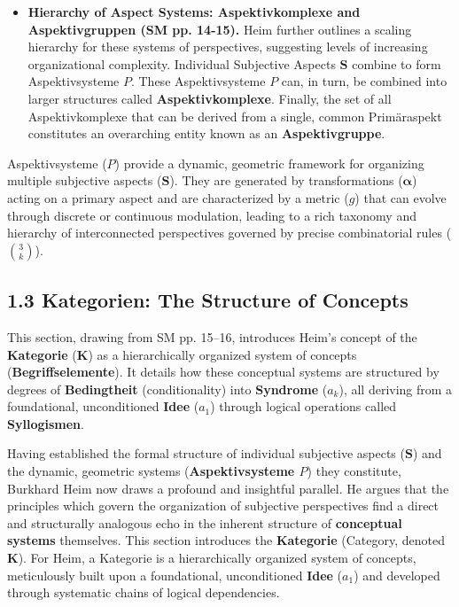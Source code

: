 \documentclass[12pt]{article}
\newcommand{\kategorie}{\bm{K}}
\newcommand{\conceptualsyndrome}{a} %
\newcommand{\aspektivsystem}{P}
\begin{document}
\begin{itemize}
    \item \textbf{Hierarchy of Aspect Systems: Aspektivkomplexe and Aspektivgruppen (SM pp. 14-15).}
    Heim further outlines a scaling hierarchy for these systems of perspectives, suggesting levels of increasing organizational complexity. Individual Subjective Aspects \( \mathbf{S} \) combine to form Aspektivsysteme \( \aspektivsystem \). These Aspektivsysteme \( \aspektivsystem \) can, in turn, be combined into larger structures called \textbf{Aspektivkomplexe}. Finally, the set of all Aspektivkomplexe that can be derived from a single, common Primäraspekt constitutes an overarching entity known as an \textbf{Aspektivgruppe}.
\end{itemize}

Aspektivsysteme (\(\aspektivsystem\)) provide a dynamic, geometric framework for organizing multiple subjective aspects (\(\mathbf{S}\)). They are generated by transformations (\(\bm{\alpha}\)) acting on a primary aspect and are characterized by a metric (\(g\)) that can evolve through discrete or continuous modulation, leading to a rich taxonomy and hierarchy of interconnected perspectives governed by precise combinatorial rules (\(\binom{3}{k}\)).

\subsection{1.3 Kategorien: The Structure of Concepts}
\label{sec:kategorien}

This section, drawing from SM pp. 15--16, introduces Heim's concept of the \textbf{Kategorie} (\(\kategorie\)) as a hierarchically organized system of concepts (\textbf{Begriffselemente}). It details how these conceptual systems are structured by degrees of \textbf{Bedingtheit} (conditionality) into \textbf{Syndrome} (\(\conceptualsyndrome_k\)), all deriving from a foundational, unconditioned \textbf{Idee} (\(\conceptualsyndrome_1\)) through logical operations called \textbf{Syllogismen}.

Having established the formal structure of individual subjective aspects (\(\mathbf{S}\)) and the dynamic, geometric systems (\textbf{Aspektivsysteme \(\aspektivsystem\)}) they constitute, Burkhard Heim now draws a profound and insightful parallel. He argues that the principles which govern the organization of subjective perspectives find a direct and structurally analogous echo in the inherent structure of \textbf{conceptual systems} themselves. This section introduces the \textbf{Kategorie} (Category, denoted \(\kategorie\)). For Heim, a Kategorie is a hierarchically organized system of concepts, meticulously built upon a foundational, unconditioned \textbf{Idee} (\(\conceptualsyndrome_1\)) and developed through systematic chains of logical dependencies.
\end{document}
